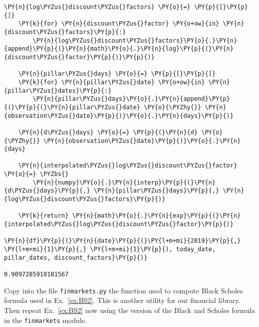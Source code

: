 \begin{Answer}
\begin{tcolorbox}[size=fbox, boxrule=1pt, colback=cellbackground, colframe=cellborder]
\begin{Verbatim}[commandchars=\\\{\}]
    \PY{n}{log\PYZus{}discount\PYZus{}factors} \PY{o}{=} \PY{p}{[}\PY{p}{]}
    \PY{k}{for} \PY{n}{discount\PYZus{}factor} \PY{o+ow}{in} \PY{n}{discount\PYZus{}factors}\PY{p}{:}
        \PY{n}{log\PYZus{}discount\PYZus{}factors}\PY{o}{.}\PY{n}{append}\PY{p}{(}\PY{n}{math}\PY{o}{.}\PY{n}{log}\PY{p}{(}\PY{n}{discount\PYZus{}factor}\PY{p}{)}\PY{p}{)}
    
    \PY{n}{pillar\PYZus{}days} \PY{o}{=} \PY{p}{[}\PY{p}{]}
    \PY{k}{for} \PY{n}{pillar\PYZus{}date} \PY{o+ow}{in} \PY{n}{pillar\PYZus{}dates}\PY{p}{:}
        \PY{n}{pillar\PYZus{}days}\PY{o}{.}\PY{n}{append}\PY{p}{(}\PY{p}{(}\PY{n}{pillar\PYZus{}date} \PY{o}{\PYZhy{}} \PY{n}{observation\PYZus{}date}\PY{p}{)}\PY{o}{.}\PY{n}{days}\PY{p}{)}
    
    \PY{n}{d\PYZus{}days} \PY{o}{=} \PY{p}{(}\PY{n}{d} \PY{o}{\PYZhy{}} \PY{n}{observation\PYZus{}date}\PY{p}{)}\PY{o}{.}\PY{n}{days}
    
    \PY{n}{interpolated\PYZus{}log\PYZus{}discount\PYZus{}factor} \PY{o}{=} \PYZbs{}
        \PY{n}{numpy}\PY{o}{.}\PY{n}{interp}\PY{p}{(}\PY{n}{d\PYZus{}days}\PY{p}{,} \PY{n}{pillar\PYZus{}days}\PY{p}{,} \PY{n}{log\PYZus{}discount\PYZus{}factors}\PY{p}{)}
    
    \PY{k}{return} \PY{n}{math}\PY{o}{.}\PY{n}{exp}\PY{p}{(}\PY{n}{interpolated\PYZus{}log\PYZus{}discount\PYZus{}factor}\PY{p}{)}

\PY{n}{df}\PY{p}{(}\PY{n}{date}\PY{p}{(}\PY{l+m+mi}{2019}\PY{p}{,} \PY{l+m+mi}{1}\PY{p}{,} \PY{l+m+mi}{1}\PY{p}{), today_date, pillar_dates, discount_factors}\PY{p}{)}

0.9097285910181567
\end{Verbatim}
\end{tcolorbox} 
\end{Answer}

\begin{Exercise}[label={ex:BS3}, title={(Black-Scholes Again)}]
Copy into the file \texttt{finmarkets.py} the function used to compute Black Scholes formula used in Ex.~\ref{ex:BS2}. This is another utility for our financial library. Then repeat Ex.~\ref{ex:BS2} now using the version of the Black and Scholes formula in the \texttt{finmarkets} module.
\end{Exercise}

